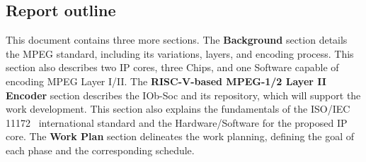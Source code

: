 \subsection{Report outline}

This document contains three more sections. The \textbf{Background} section
details the MPEG standard, including its variations, layers, and encoding
process. This section also describes two IP cores, three Chips, and one Software
capable of encoding MPEG Layer I/II. The \textbf{RISC-V-based MPEG-1/2 Layer II
  Encoder} section describes the IOb-Soc and its repository, which will support
the work development. This section also explains the fundamentals of the ISO/IEC
11172~\cite{11172} international standard and the Hardware/Software for the proposed IP
core. The \textbf{Work Plan} section delineates the work planning, defining the
goal of each phase and the corresponding schedule.
